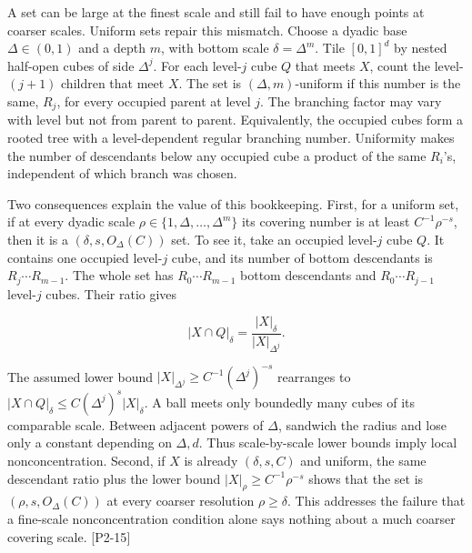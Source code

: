 \hypertarget{04-visual-computing-ii-ch033-uniform-trees-make-multiscale-size-usable}{}

A set can be large at the finest scale and still fail to have enough points at coarser scales. Uniform sets repair this mismatch. Choose a dyadic base \(\Delta\in(0,1)\) and a depth \(m\), with bottom scale \(\delta=\Delta^m\). Tile \([0,1]^d\) by nested half-open cubes of side \(\Delta^j\). For each level-\(j\) cube \(Q\) that meets \(X\), count the level-\((j+1)\) children that meet \(X\). The set is \((\Delta,m)\)-uniform if this number is the same, \(R_j\), for every occupied parent at level \(j\). The branching factor may vary with level but not from parent to parent. Equivalently, the occupied cubes form a rooted tree with a level-dependent regular branching number. Uniformity makes the number of descendants below any occupied cube a product of the same \(R_i\)'s, independent of which branch was chosen.

Two consequences explain the value of this bookkeeping. First, for a uniform set, if at every dyadic scale \(\rho\in\{1,\Delta,\ldots,\Delta^m\}\) its covering number is at least \(C^{-1}\rho^{-s}\), then it is a \((\delta,s,O_\Delta(C))\) set. To see it, take an occupied level-\(j\) cube \(Q\). It contains one occupied level-\(j\) cube, and its number of bottom descendants is \(R_j\cdots R_{m-1}\). The whole set has \(R_0\cdots R_{m-1}\) bottom descendants and \(R_0\cdots R_{j-1}\) level-\(j\) cubes. Their ratio gives

\[|X\cap Q|_\delta=\frac{|X|_\delta}{|X|_{\Delta^j}}.\]

The assumed lower bound \(|X|_{\Delta^j}\ge C^{-1}(\Delta^j)^{-s}\) rearranges to \(|X\cap Q|_\delta\le C(\Delta^j)^s|X|_\delta\). A ball meets only boundedly many cubes of its comparable scale. Between adjacent powers of \(\Delta\), sandwich the radius and lose only a constant depending on \(\Delta,d\). Thus scale-by-scale lower bounds imply local nonconcentration. Second, if \(X\) is already \((\delta,s,C)\) and uniform, the same descendant ratio plus the lower bound \(|X|_\rho\ge C^{-1}\rho^{-s}\) shows that the set is \((\rho,s,O_\Delta(C))\) at every coarser resolution \(\rho\ge\delta\). This addresses the failure that a fine-scale nonconcentration condition alone says nothing about a much coarser covering scale. {[}P2-15{]}


